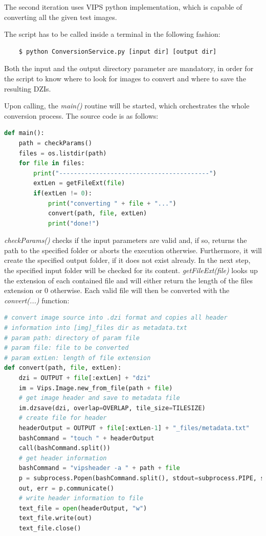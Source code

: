 The second iteration uses VIPS python implementation, which is capable of converting all the given test images.

The script has to be called inside a terminal in the following fashion:

\begin{lstlisting}
	$ python ConversionService.py [input dir] [output dir]
\end{lstlisting}

Both the input and the output directory parameter are mandatory, in order for the script to know where to look for images to convert and where to save the resulting DZIs.

Upon calling, the \emph{main()} routine will be started, which orchestrates the whole conversion process. The source code is as follows:

\begin{lstlisting}[frame=single, language=python]
def main():
	path = checkParams()
	files = os.listdir(path)
	for file in files:
		print("-----------------------------------------")
		extLen = getFileExt(file)
		if(extLen != 0):
			print("converting " + file + "...")
			convert(path, file, extLen)
			print("done!")
\end{lstlisting}

\emph{checkParams()} checks if the input parameters are valid and, if so, returns the path to the specified folder or aborts the execution otherwise. Furthermore, it will create the specified output folder, if it does not exist already. In the next step, the specified input folder will be checked for its content. \emph{getFileExt(file)} looks up the extension of each contained file and will either return the length of the files extension or $0$ otherwise. Each valid file will then be converted with the \emph{convert(...)} function:

\begin{lstlisting}[frame=single, language=python]
# convert image source into .dzi format and copies all header 
# information into [img]_files dir as metadata.txt
# param path: directory of param file
# param file: file to be converted
# param extLen: length of file extension
def convert(path, file, extLen):
	dzi = OUTPUT + file[:extLen] + "dzi"
	im = Vips.Image.new_from_file(path + file)
	# get image header and save to metadata file
	im.dzsave(dzi, overlap=OVERLAP, tile_size=TILESIZE)
	# create file for header
	headerOutput = OUTPUT + file[:extLen-1] + "_files/metadata.txt"
	bashCommand = "touch " + headerOutput
	call(bashCommand.split())
	# get header information
	bashCommand = "vipsheader -a " + path + file
	p = subprocess.Popen(bashCommand.split(), stdout=subprocess.PIPE, stderr=subprocess.PIPE)
	out, err = p.communicate()
	# write header information to file
	text_file = open(headerOutput, "w")
	text_file.write(out)
	text_file.close()
\end{lstlisting}

